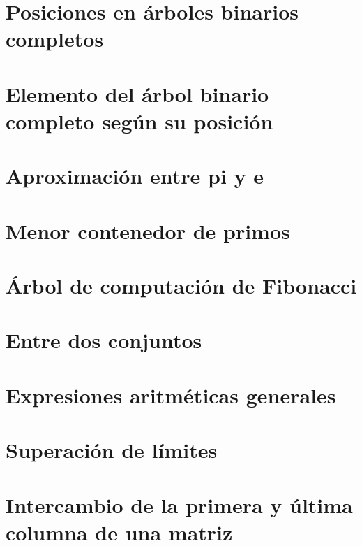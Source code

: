 \documentclass[a4paper,12pt,twoside]{book}
\begin{document}
\chapter{Posiciones en árboles binarios completos}
\label{051218}

\chapter{Elemento del árbol binario completo según su
  posición}
\label{061218}

\chapter{Aproximación entre pi y e}
\label{071218}

\chapter{Menor contenedor de primos}
\label{101218}

\chapter{Árbol de computación de Fibonacci}
\label{111218}

\chapter{Entre dos conjuntos}
\label{121218}

\chapter{Expresiones aritméticas generales}
\label{131218}

\chapter{Superación de límites}
\label{141218}

\chapter{Intercambio de la primera y última columna de
  una matriz}
\label{171218}
\end{document}
